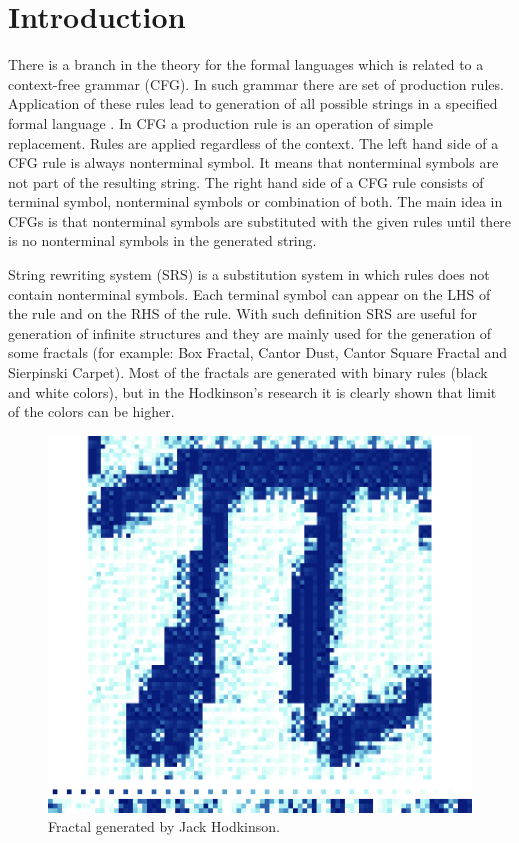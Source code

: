 \documentclass{llncs}
\begin{document}
\section{Introduction} \label{Introduction}

There is a branch in the theory for the formal languages which is related to a context-free grammar (CFG). In such grammar there are set of production rules. Application of these rules lead to generation of all possible strings in a specified formal language \cite{ochoa01}. In CFG a production rule is an operation of simple replacement. Rules are applied regardless of the context. The left hand side of a CFG rule is always nonterminal symbol. It means that nonterminal symbols are not part of the resulting string. The right hand side of a CFG rule consists of terminal symbol, nonterminal symbols or combination of both. The main idea in CFGs is that nonterminal symbols are substituted with the given rules until there is no nonterminal symbols in the generated string. 

String rewriting system (SRS) is a substitution system in which rules does not contain nonterminal symbols. Each terminal symbol can appear on the LHS of the rule and on the RHS of the rule. With such definition SRS are useful for generation of infinite structures and they are mainly used for the generation of some fractals (for example: Box Fractal, Cantor Dust, Cantor Square Fractal and Sierpinski Carpet). Most of the fractals are generated with binary rules (black and white colors), but in the Hodkinson's research it is clearly shown that limit of the colors can be higher. 

\begin{figure}[h!]
  \centering
  \includegraphics[width=1.0\linewidth]{pic01}
  \caption{Fractal generated by Jack Hodkinson.}
\label{fig:pic01}
\end{figure}
\end{document}
